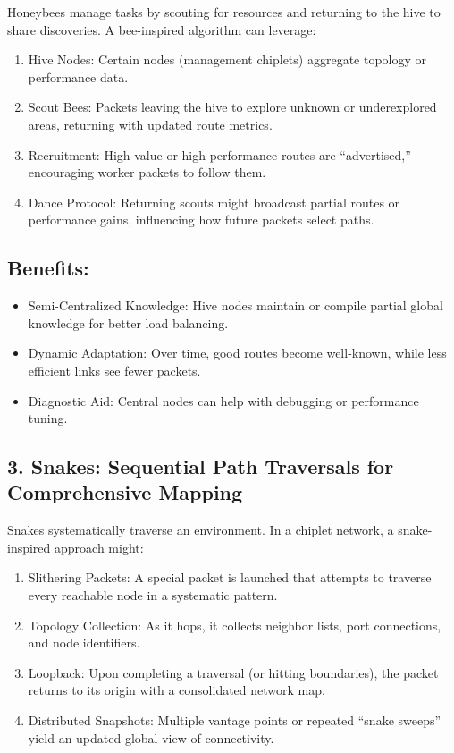 \documentclass[../OAE-SPEC-MAIN.tex]{subfiles}
\begin{document}
Honeybees manage tasks by scouting for resources and returning to the hive to share discoveries. A bee-inspired algorithm can leverage:
\begin{enumerate}
\item  Hive Nodes: Certain nodes (management chiplets) aggregate topology or performance data.
\item  Scout Bees: Packets leaving the hive to explore unknown or underexplored areas, returning with updated route metrics.
\item  Recruitment: High-value or high-performance routes are “advertised,” encouraging worker packets to follow them.
\item  Dance Protocol: Returning scouts might broadcast partial routes or performance gains, influencing how future packets select paths.
\end{enumerate}

\subsection{Benefits:}
\begin{itemize}
	\item Semi-Centralized Knowledge: Hive nodes maintain or compile partial global knowledge for better load balancing.
	\item Dynamic Adaptation: Over time, good routes become well-known, while less efficient links see fewer packets.
	\item Diagnostic Aid: Central nodes can help with debugging or performance tuning.
\end{itemize}

\subsection{3. Snakes: Sequential Path Traversals for Comprehensive Mapping}

Snakes systematically traverse an environment. In a chiplet network, a snake-inspired approach might:
\begin{enumerate}
	\item  Slithering Packets: A special packet is launched that attempts to traverse every reachable node in a systematic pattern.
	\item  Topology Collection: As it hops, it collects neighbor lists, port connections, and node identifiers.
	\item  Loopback: Upon completing a traversal (or hitting boundaries), the packet returns to its origin with a consolidated network map.
	\item  Distributed Snapshots: Multiple vantage points or repeated “snake sweeps” yield an updated global view of connectivity.
\end{enumerate}
\end{document}
